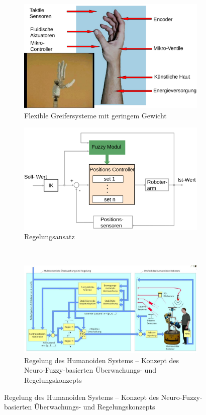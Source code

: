 \begin{figure}
	\centering
	\begin{subfigure}{.4\textwidth}
		\includegraphics[width=\textwidth]{figures/flexible_greifersysteme.png}
		\caption{Flexible Greifersysteme mit geringem Gewicht}
	\end{subfigure}
	\begin{subfigure}{.4\textwidth}
		\includegraphics[width=\textwidth]{figures/regelungsansatz.png}
		\caption{Regelungsansatz}
	\end{subfigure}\\
	\begin{subfigure}{.7\textwidth}
		\includegraphics[width=\textwidth]{figures/regelung_humanoider.png}
		\caption{Regelung des Humanoiden Systems -- Konzept des Neuro-Fuzzy-basierten Überwachungs- und Regelungskonzepts}
	\end{subfigure}
\end{figure}

